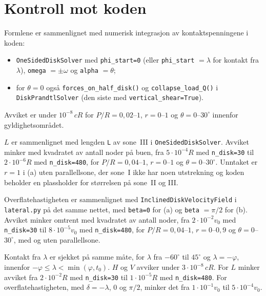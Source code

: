 \documentclass[11pt,a4paper]{article}
\begin{document}
\section{Kontroll mot koden}

Formlene er sammenlignet med numerisk integrasjon av kontaktspenningene i
koden:
\begin{itemize}
  \item \texttt{OneSidedDiskSolver} med \texttt{phi\_start=0} (eller
        \texttt{phi\_start} $= \lambda$ for kontakt fra $\lambda$),
        \texttt{omega} $= \pm\omega$ og \texttt{alpha} $= \theta$;
  \item for $\theta = 0$ også \texttt{forces\_on\_half\_disk()} og
        \texttt{collapse\_load\_Q()} i \texttt{DiskPrandtlSolver}
        (den siste med \texttt{vertical\_shear=True}).
\end{itemize}
Avviket er under $10^{-8}\,cR$ for $P/R = 0{,}02$--$1$, $r = 0$--$1$ og
$\theta = 0$--$30^\circ$ innenfor gyldighetsområdet.

$L$ er sammenlignet med lengden \texttt{L} av sone~III i
\texttt{OneSidedDiskSolver}.  Avviket minker med kvadratet av antall noder
på buen, fra $5\cdot10^{-4}R$ med \texttt{n\_disk=30} til $2\cdot10^{-6}R$
med \texttt{n\_disk=480}, for $P/R = 0{,}04$--$1$, $r = 0$--$1$ og
$\theta = 0$--$30^\circ$.  Unntaket er $r = 1$ i (a) uten parallellsone, der
sone~I ikke har noen utstrekning og koden beholder en plassholder for
størrelsen på sone~II og III.

Overflatehastigheten er sammenlignet med \texttt{InclinedDiskVelocityField}
i \texttt{lateral.py} på det samme nettet, med \texttt{beta=0} for (a) og
\texttt{beta} $= \pi/2$ for (b).  Avviket minker omtrent med kvadratet av
antall noder, fra $2\cdot10^{-2}v_0$ med \texttt{n\_disk=30} til
$8\cdot10^{-5}v_0$ med \texttt{n\_disk=480}, for $P/R = 0{,}04$--$1$,
$r = 0$--$0{,}9$ og $\theta = 0$--$30^\circ$, med og uten parallellsone.

Kontakt fra $\lambda$ er sjekket på samme måte, for $\lambda$ fra $-60^\circ$
til $45^\circ$ og $\lambda = -\varphi$, innenfor
$-\varphi \le \lambda < \min(\varphi, t_0)$.  $H$ og $V$ avviker under
$3\cdot10^{-8}\,cR$.  For $L$ minker avviket fra $2\cdot10^{-2}R$ med
\texttt{n\_disk=30} til $1\cdot10^{-5}R$ med \texttt{n\_disk=480}.  For
overflatehastigheten, med $\delta = -\lambda$, $0$ og $\pi/2$, minker det fra
$1\cdot10^{-1}v_0$ til $5\cdot10^{-4}v_0$.
\end{document}
